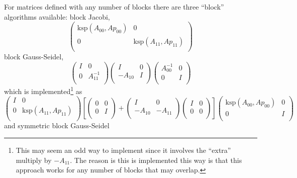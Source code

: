 For matrices defined with any number of blocks there are three ``block'' algorithms available: block Jacobi,
\[
\left( \begin{array}{cc}
  \text{ksp}(A_{00},Ap_{00})   & 0 \\
  0   & \text{ksp}(A_{11},Ap_{11}) \\
\end{array} \right)
\]
block Gauss-Seidel,
\[
\left( \begin{array}{cc}
I   & 0 \\
0 & A^{-1}_{11} \\
\end{array} \right)
\left( \begin{array}{cc}
I   & 0 \\
-A_{10} & I \\
\end{array} \right)
\left( \begin{array}{cc}
A^{-1}_{00}   & 0 \\
0 & I \\
\end{array} \right)
\]
which is implemented\footnote{This may seem an odd way to implement since it involves the ``extra'' multiply by $ -A_{11}$. The reason is this is implemented this way is that this approach works for any number of blocks that may overlap.} as
\[
\left( \begin{array}{cc}
I   & 0 \\
  0 & \text{ksp}(A_{11},Ap_{11}) \\
\end{array} \right)
\left[
\left( \begin{array}{cc}
0   & 0 \\
0 & I \\
\end{array} \right)
+
\left( \begin{array}{cc}
I   & 0 \\
-A_{10} & -A_{11} \\
\end{array} \right)
\left( \begin{array}{cc}
I   & 0 \\
0 & 0 \\
\end{array} \right)
\right]
\left( \begin{array}{cc}
  \text{ksp}(A_{00},Ap_{00})   & 0 \\
0 & I \\
\end{array} \right)
\]
 and symmetric block Gauss-Seidel
